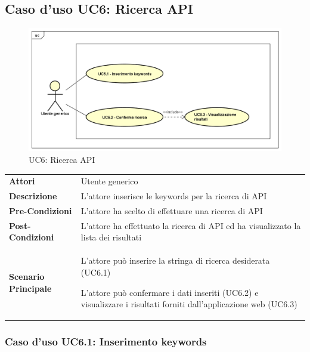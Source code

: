 \newpage
\subsection{Caso d'uso UC6: Ricerca API}
\label{UC6}
\begin{figure}[ht]
	\centering
	\includegraphics[scale=0.45]{UML/UC6.png}
	\caption{UC6: Ricerca API}
\end{figure}

\begin{longtable}{ l | p{11cm}}
	\hline
	\rowcolor{Gray}
	 \multicolumn{2}{c}{UC6 - Ricerca API} \\
	 \hline
	\textbf{Attori} & Utente generico \\
	\textbf{Descrizione} & L'attore inserisce le keywords per la ricerca di API \\
	\textbf{Pre-Condizioni} & L'attore ha scelto di effettuare una ricerca di API \\
	\textbf{Post-Condizioni} & L'attore ha effettuato la ricerca di API ed ha visualizzato la lista dei risultati \\
	\textbf{Scenario Principale} & 
	\begin{enumerate*}[label=(\arabic*.),itemjoin={\newline}]
		\item L'attore può inserire la stringa di ricerca desiderata (UC6.1)
		\item L'attore può confermare i dati inseriti (UC6.2) e visualizzare i risultati forniti dall'applicazione web (UC6.3)
	\end{enumerate*}\\
\end{longtable}

\subsubsection{Caso d'uso UC6.1: Inserimento keywords}
\label{UC6_1}

